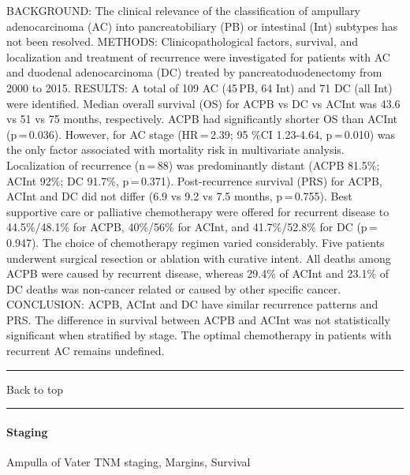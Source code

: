 \documentclass[]{article}
\let\oldparagraph\paragraph
\renewcommand{\paragraph}[1]{\oldparagraph{#1}\mbox{}}
\begin{document}
BACKGROUND: The clinical relevance of the classification of ampullary
adenocarcinoma (AC) into pancreatobiliary (PB) or intestinal (Int)
subtypes has not been resolved. METHODS: Clinicopathological factors,
survival, and localization and treatment of recurrence were investigated
for patients with AC and duodenal adenocarcinoma (DC) treated by
pancreatoduodenectomy from 2000 to 2015. RESULTS: A total of 109 AC
(45\,PB, 64 Int) and 71 DC (all Int) were identified. Median overall
survival (OS) for ACPB vs DC vs ACInt was 43.6 vs 51 vs 75 months,
respectively. ACPB had significantly shorter OS than ACInt
(p\,=\,0.036). However, for AC stage (HR\,=\,2.39; 95 \%CI 1.23-4.64,
p\,=\,0.010) was the only factor associated with mortality risk in
multivariate analysis. Localization of recurrence (n\,=\,88) was
predominantly distant (ACPB 81.5\%; ACInt 92\%; DC 91.7\%, p\,=\,0.371).
Post-recurrence survival (PRS) for ACPB, ACInt and DC did not differ
(6.9 vs 9.2 vs 7.5 months, p\,=\,0.755). Best supportive care or
palliative chemotherapy were offered for recurrent disease to
44.5\%/48.1\% for ACPB, 40\%/56\% for ACInt, and 41.7\%/52.8\% for DC
(p\,=\,0.947). The choice of chemotherapy regimen varied considerably.
Five patients underwent surgical resection or ablation with curative
intent. All deaths among ACPB were caused by recurrent disease, whereas
29.4\% of ACInt and 23.1\% of DC deaths was non-cancer related or caused
by other specific cancer. CONCLUSION: ACPB, ACInt and DC have similar
recurrence patterns and PRS. The difference in survival between ACPB and
ACInt was not statistically significant when stratified by stage. The
optimal chemotherapy in patients with recurrent AC remains undefined.

{}

{}

\begin{center}\rule{0.5\linewidth}{\linethickness}\end{center}

Back to top

\begin{center}\rule{0.5\linewidth}{\linethickness}\end{center}

\pagebreak

\hypertarget{staging-2}{%
\paragraph{Staging}\label{staging-2}}

Ampulla of Vater TNM staging, Margins, Survival
\end{document}
